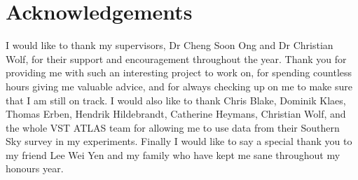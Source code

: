 
\chapter*{Acknowledgements}
\label{cha:ack}

I would like to thank my supervisors, Dr Cheng Soon Ong and Dr Christian Wolf, for their support
and encouragement throughout the year. Thank you for providing me with such an interesting project
to work on, for spending countless hours giving me valuable advice, and for always checking up on
me to make sure that I am still on track. I would also like to thank Chris Blake, Dominik Klaes,
Thomas Erben, Hendrik Hildebrandt, Catherine Heymans, Christian Wolf, and the whole VST ATLAS team
for allowing me to use data from their Southern Sky survey in my experiments. Finally I would
like to say a special thank you to my friend Lee Wei Yen and my family who have kept me sane
throughout my honours year.



